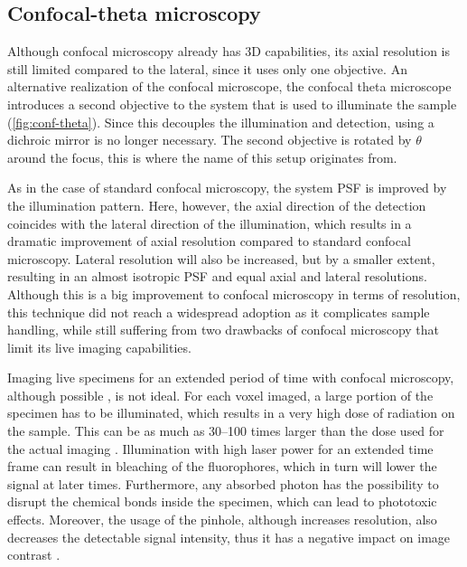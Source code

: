   \subsection{Confocal-theta microscopy}

    Although confocal microscopy already has 3D capabilities, its axial resolution is still limited compared to the lateral, since it uses only one objective. An alternative realization of the confocal microscope, the confocal theta microscope \cite{stelzer_fundamental_1994} introduces a second objective to the system that is used to illuminate the sample (\autoref{fig:conf-theta}). Since this decouples the illumination and detection, using a dichroic mirror is no longer necessary. The second objective is rotated by $\theta$ around the focus, this is where the name of this setup originates from.

    As in the case of standard confocal microscopy, the system PSF is improved by the illumination pattern. Here, however, the axial direction of the detection coincides with the lateral direction of the illumination, which results in a dramatic improvement of axial resolution compared to standard confocal microscopy. Lateral resolution will also be increased, but by a smaller extent, resulting in an almost isotropic PSF and equal axial and lateral resolutions. %
    Although this is a big improvement to confocal microscopy in terms of resolution, this technique did not reach a widespread adoption as it complicates sample handling, while still suffering from two drawbacks of confocal microscopy that limit its live imaging capabilities.

    Imaging live specimens for an extended period of time with confocal microscopy, although possible \cite{aldaz_live_2010, maitre_asymmetric_2016}, is not ideal. For each voxel imaged, a large portion of the specimen has to be illuminated, which results in a very high dose of radiation on the sample. This can be as much as 30--100 times larger than the dose used for the actual imaging \cite{reynaud_light_2008}. Illumination with high laser power for an extended time frame can result in bleaching of the fluorophores, which in turn will lower the signal at later times. Furthermore, any absorbed photon has the possibility to disrupt the chemical bonds inside the specimen, which can lead to phototoxic effects. Moreover, the usage of the pinhole, although increases resolution, also decreases the detectable signal intensity, thus it has a negative impact on image contrast \cite{stelzer_contrast_1998}.

